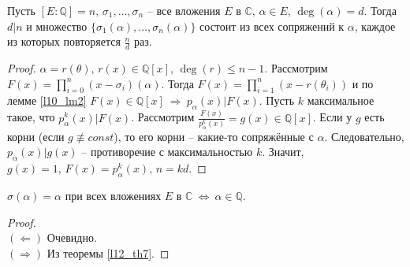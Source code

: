 \begin{theorem} \label{l12_th7}
	Пусть $[E \colon \mathbb{Q}] = n, \, \sigma_1,\dots,\sigma_n$ -- все вложения $E$ в $\mathbb{C}, \, \alpha \in E, \, \deg(\alpha) = d$. Тогда $d \vert n$ и множество $\{ \sigma_1(\alpha),\dots,\sigma_n(\alpha) \}$ состоит из всех сопряжений к $\alpha$, каждое из которых повторяется $\displaystyle \frac{n}{d}$ раз.
\end{theorem}
\begin{proof}
	$\alpha = r(\theta), \, r(x) \in \mathbb{Q}[x], \, \deg(r) \leq n-1$. 
	Рассмотрим $\displaystyle F(x) = \prod\limits_{i=0}^n (x-\sigma_i)(\alpha)$. Тогда $\displaystyle F(x) = \prod\limits_{i=1}^n (x-r(\theta_i))$ и по лемме \ref{l10_lm2} $F(x) \in \mathbb{Q}[x] \ \Rightarrow \ p_\alpha(x) \vert F(x)$. 
	Пусть $k$ максимальное такое, что $p_\alpha^k(x) \vert F(x)$. Рассмотрим $\displaystyle \frac{F(x)}{p_\alpha^k(x)} = g(x) \in \mathbb{Q}[x]$. 
	Если у $g$ есть корни (если $g \not\equiv const$), то его корни -- какие-то сопряжённые с $\alpha$. Следовательно, $p_\alpha(x) \vert g(x)$ -- противоречие с максимальностью $k$. 
	Значит, $g(x)=1,\,F(x)=p_\alpha^k(x),\,n=kd$.
\end{proof}

\begin{corollary}
	$\sigma(\alpha) = \alpha$ при всех вложениях $E$ в $\mathbb{C} \ \Leftrightarrow \ \alpha \in \mathbb{Q}$.
\end{corollary}
\begin{proof}~\\
	$(\Leftarrow)$ Очевидно.\\
	$(\Rightarrow)$ Из теоремы \ref{l12_th7}.
\end{proof}